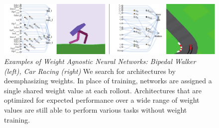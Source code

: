 

%

\begin{figure}[!htb]   
\vskip -0.05in %
    \centering        
    \includegraphics[width=1\textwidth]{img/cover.pdf}       
\vskip -0.05in %
    \caption      
    {     
        \textit{Examples of Weight Agnostic Neural Networks: Bipedal Walker (left), Car Racing (right)}
        \newline
		We search for architectures by deemphasizing weights. In place of training, networks are assigned a single shared weight value at each rollout. Architectures that are optimized for expected performance over a wide range of weight values are still able to perform various tasks without weight training.
    }         
    \label{fig:cover_diagram} 
\vskip -0.05in %
\end{figure}